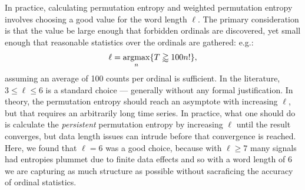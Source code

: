 In practice, calculating permutation entropy and weighted permutation entropy involves choosing a good value for the word length $\ell$. The primary consideration is that the value be large enough that forbidden ordinals are discovered, yet small enough that reasonable statistics over the ordinals are gathered: e.g.:
\begin{align*}
  \ell = \operatornamewithlimits{argmax}_n \{ T \gtrapprox 100 n! \},
\end{align*}
assuming an average of 100 counts per ordinal is sufficient. In the literature, $3 \le \ell \le 6$ is a standard choice --- generally without any formal justification. In theory, the permutation entropy should reach an asymptote with increasing $\ell$, but that requires an arbitrarily long time series. In practice, what one should do is calculate the \emph{persistent} permutation entropy by increasing $\ell$ until the result converges, but data length issues can intrude before that convergence is reached. Here, we found that $\ell = 6$ was a good choice, because with $\ell \geq 7$ many signals had entropies plummet due to finite data effects and so with a word length of 6 we are capturing as much structure as possible without sacraficing the accuracy of ordinal statistics.

